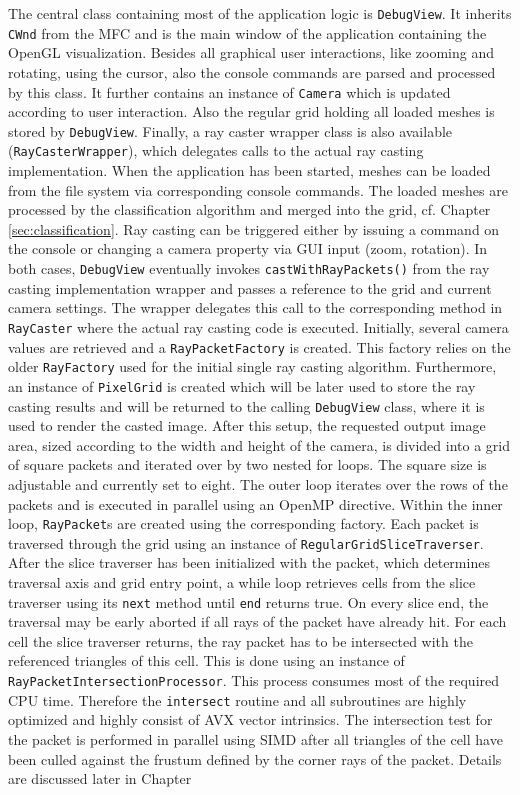The central class containing most of the application logic is \lstinline!DebugView!. It inherits \lstinline!CWnd! from the MFC and is the main window of the application containing the OpenGL visualization. Besides all graphical user interactions, like zooming and rotating, using the cursor, also the console commands are parsed and processed by this class. It further contains an instance of \lstinline!Camera! which is updated according to user interaction. Also the regular grid holding all loaded meshes is stored by \lstinline!DebugView!. Finally, a ray caster wrapper class is also available (\lstinline!RayCasterWrapper!), which delegates calls to the actual ray casting implementation. When the application has been started, meshes can be loaded from the file system via corresponding console commands. The loaded meshes are processed by the classification algorithm and merged into the grid, cf. Chapter \ref{sec:classification}. Ray casting can be triggered either by issuing a command on the console or changing a camera property via GUI input (zoom, rotation). In both cases, \lstinline!DebugView! eventually invokes \lstinline!castWithRayPackets()! from the ray casting implementation wrapper and passes a reference to the grid and current camera settings. The wrapper delegates this call to the corresponding method in \lstinline!RayCaster! where the actual ray casting code is executed. Initially, several camera values are retrieved and a \lstinline!RayPacketFactory! is created. This factory relies on the older \lstinline!RayFactory! used for the initial single ray casting algorithm. Furthermore, an instance of \lstinline!PixelGrid! is created which will be later used to store the ray casting results and will be returned to the calling \lstinline!DebugView! class, where it is used to render the casted image. After this setup, the requested output image area, sized according to the width and height of the camera, is divided into a grid of square packets and iterated over by two nested for loops. The square size is adjustable and currently set to eight. The outer loop iterates over the rows of the packets and is executed in parallel using an OpenMP directive. Within the inner loop, \lstinline!RayPacket!s are created using the corresponding factory. Each packet is traversed through the grid using an instance of \lstinline!RegularGridSliceTraverser!. After the slice traverser has been initialized with the packet, which determines traversal axis and grid entry point, a while loop retrieves cells from the slice traverser using its \lstinline!next! method until \lstinline!end! returns true. On every slice end, the traversal may be early aborted if all rays of the packet have already hit. For each cell the slice traverser returns, the ray packet has to be intersected with the referenced triangles of this cell. This is done using an instance of \lstinline!RayPacketIntersectionProcessor!. This process consumes most of the required CPU time. Therefore the \lstinline!intersect! routine and all subroutines are highly optimized and highly consist of AVX vector intrinsics. The intersection test for the packet is performed in parallel using SIMD after all triangles of the cell have been culled against the frustum defined by the corner rays of the packet. Details are discussed later in Chapter 